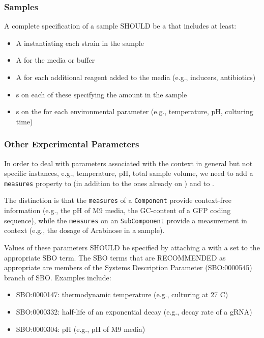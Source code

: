 \subsubsection{Samples}

A complete specification of a sample SHOULD be a  that includes at least:
\begin{itemize}
\item A  instantiating each strain in the sample
\item A  for the media or buffer
\item A  for each additional reagent added to the media (e.g., inducers, antibiotics)
\item {}s on each of these specifying the amount in the sample
\item {}s on the  for each environmental parameter (e.g., temperature, pH, culturing time)
\end{itemize}

\subsubsection{Other Experimental Parameters}

In order to deal with parameters associated with the context in general but not specific instances, e.g., temperature, pH, total sample volume, we need to add a \texttt{measures} property to  (in addition to the ones already on ) and to .

The distinction is that the \texttt{measures} of a \texttt{Component} provide context-free information (e.g., the pH of M9 media, the GC-content of a GFP coding sequence), while the \texttt{measures} on an \texttt{SubComponent} provide a measurement in context (e.g., the dosage of Arabinose in a sample).

Values of these parameters SHOULD be specified by attaching a  with a  set to the appropriate SBO term. The SBO terms that are RECOMMENDED as appropriate are members of the Systems Description Parameter (SBO:0000545) branch of SBO. Examples include:
\begin{itemize}
\item SBO:0000147: thermodynamic temperature (e.g., culturing at 27 C)
\item SBO:0000332: half-life of an exponential decay (e.g., decay rate of a gRNA)
\item SBO:0000304: pH (e.g., pH of M9 media)
\end{itemize}
